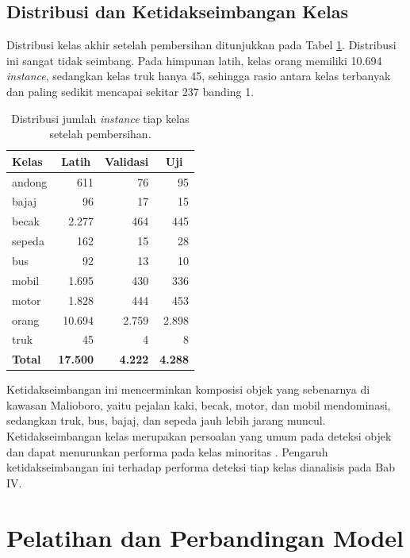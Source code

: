 \subsection{Distribusi dan Ketidakseimbangan Kelas}

Distribusi kelas akhir setelah pembersihan ditunjukkan pada Tabel 
\ref{tab:distribusi_kelas}. Distribusi ini sangat tidak seimbang. Pada himpunan latih, 
kelas orang memiliki 10.694 \textit{instance}, sedangkan kelas truk hanya 45, sehingga 
rasio antara kelas terbanyak dan paling sedikit mencapai sekitar 237 banding 1.

\begin{table}[h]
    \centering
    \caption{Distribusi jumlah \textit{instance} tiap kelas setelah pembersihan.}
    \label{tab:distribusi_kelas}
    \begin{tabular}{|l|r|r|r|}
        \hline
        \textbf{Kelas} & \multicolumn{1}{|c|}{\textbf{Latih}} & \multicolumn{1}{|c|}{\textbf{Validasi}} & \multicolumn{1}{|c|}{\textbf{Uji}} \\
        \hline \hline
        andong & 611 & 76 & 95 \\
        bajaj & 96 & 17 & 15 \\
        becak & 2.277 & 464 & 445 \\
        sepeda & 162 & 15 & 28 \\
        bus & 92 & 13 & 10 \\
        mobil & 1.695 & 430 & 336 \\
        motor & 1.828 & 444 & 453 \\
        orang & 10.694 & 2.759 & 2.898 \\
        truk & 45 & 4 & 8 \\
        \hline
        \textbf{Total} & \textbf{17.500} & \textbf{4.222} & \textbf{4.288} \\
        \hline
    \end{tabular}
\end{table}

Ketidakseimbangan ini mencerminkan komposisi objek yang sebenarnya di kawasan Malioboro, 
yaitu pejalan kaki, becak, motor, dan mobil mendominasi, sedangkan truk, bus, bajaj, dan 
sepeda jauh lebih jarang muncul. Ketidakseimbangan kelas merupakan persoalan yang umum 
pada deteksi objek dan dapat menurunkan performa pada kelas minoritas 
\cite{oksuz2021imbalance}. Pengaruh ketidakseimbangan ini terhadap performa deteksi tiap 
kelas dianalisis pada Bab IV.

\section{Pelatihan dan Perbandingan Model}
\label{sec:pelatihan}


